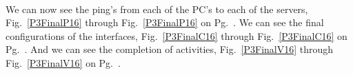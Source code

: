 \documentclass{report}
\begin{document}
\\
We can now see  the ping's from each of the PC's to each of the servers,
Fig.~\ref{P3FinalP16} through
Fig.~\ref{P3FinalP16} on Pg.~\pageref{P3FinalP16}. 
We can see the final configurations of the interfaces,
Fig.~\ref{P3FinalC16} through
Fig.~\ref{P3FinalC16} on Pg.~\pageref{P3FinalC16}.
And we can see the completion of
activities, Fig.~\ref{P3FinalV16} through
Fig.~\ref{P3FinalV16} on Pg.~\pageref{P3FinalV16}.



\begin{figure}[!hbt]\centering
{}\hfill
{}\par

\end{figure}
\end{document}
